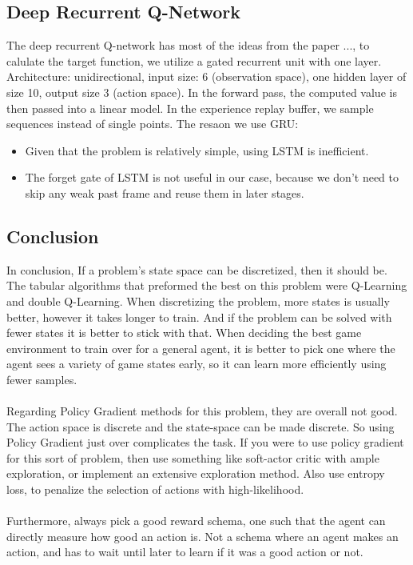 \documentclass[twoside,11pt]{article}
\begin{document}
\subsection{Deep Recurrent Q-Network}
The deep recurrent Q-network has most of the ideas from the paper ..., to calulate the target function, we utilize a gated recurrent unit with one layer. Architecture: unidirectional, input size: 6 (observation space), one hidden layer of size 10, output size 3 (action space). In the forward pass, the computed value is then passed into a linear model. In the experience replay buffer, we sample sequences instead of single points.
\newline
The resaon we use GRU: \newline
\begin{itemize}
\item Given that the problem is relatively simple, using LSTM is inefficient.
\item The forget gate of LSTM is not useful in our case, because we don't need to skip any weak past frame and reuse them in later stages. 
\end{itemize}

\subsection{Conclusion}
In conclusion, If a problem's state space can be discretized, then it should be. The tabular algorithms that preformed the best on this problem were Q-Learning and double Q-Learning. When discretizing the problem, more states is usually better, however it takes longer to train. And if the problem can be solved with fewer states it is better to stick with that.
When deciding the best game environment to train over for a general agent, it is better to pick one where the agent sees a variety of game states early, so it can learn more efficiently using fewer samples.\\\\
Regarding Policy Gradient methods for this problem, they are overall not good. The action space is discrete and the state-space can be made discrete. So using Policy Gradient just over complicates the task. If you were to use policy gradient for this sort of problem, then use something like soft-actor critic with ample exploration, or implement an extensive exploration method. Also use entropy loss, to penalize the selection of actions with high-likelihood.  \\\\
Furthermore, always pick a good reward schema, one such that the agent can directly measure how good an action is. Not a schema where an agent makes an action, and has to wait until later to learn if it was a good action or not.

\end{document}
